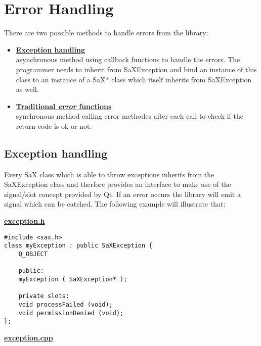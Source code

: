 \chapter{Error Handling}
\minitoc

There are two possible methods to handle errors from the library:
\begin{itemize}
\item \textbf{\underline{Exception handling}}\\
      asynchronous method using callback functions to handle the errors.
      The programmer needs to inherit from SaXException and bind an instance
      of this class to an instance of a SaX* class which itself inherits from
      SaXException as well.
\item \textbf{\underline{Traditional \textit{error} functions}}\\
      synchronous method calling error methodes after each call to check
      if the return code is ok or not. 
\end{itemize}
\section{Exception handling}
Every SaX class which is able to throw exceptions inherits from the 
SaXException class and therfore provides an interface to make use
of the signal/slot concept provided by Qt. If an error occurs the library
will emit a signal which can be catched. The following example will
illustrate that:

\textbf{\underline{exception.h}}

\begin{Command}{12cm}
\begin{small}
\begin{verbatim}
#include <sax.h>
class myException : public SaXException {
    Q_OBJECT

    public:
    myException ( SaXException* );

    private slots:
    void processFailed (void);
    void permissionDenied (void);
};
\end{verbatim}
\end{small}
\end{Command}

\newpage

\textbf{\underline{exception.cpp}}

